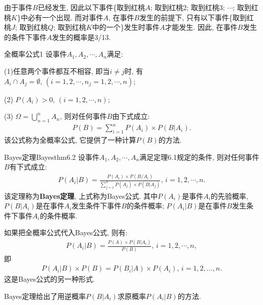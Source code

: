 \begin{result}
由于事件$B$已经发生, 因此以下事件\{取到红桃$A$; 取到红桃2; 取到红桃3; $\cdots$; 取到红桃$K$\}中必有一个出现.
而对事件$A$, 在事件$B$发生的前提下, 只有以下事件\{取到红桃$J$; 取到红桃$Q$; 取到红桃$K$中的一个\}发生时事件$A$才能发生.
因此, 在事件$B$发生的条件下事件$A$发生的概率是3/13.
\end{result}
\begin{mythm}{全概率公式}{1}
设事件$A_1, A_2, \cdots, A_n$满足:

    (1)任意两个事件都互不相容, 即当$i\neq j$时, 有$A_i\cap A_j=\emptyset,\, (i=1,2,\cdots ,n_j=1,2,\cdots ,n)$;

    (2) $P(A_i)>0,\, (i=1, 2, \cdots, n)$;

    (3) $\Omega=\bigcup_{n=1}^{n} A_{n}$, 则对任何事件$B$由下式成立:
\begin{align}
  P(B)=\sum_{i=1}^{n} P\left(A_{i}\right) \times P\left(B | A_{i}\right).
\end{align}
该公式称为全概率公式, 它提供了一种计算$P(B)$的方法.
\end{mythm}
\begin{mythm}{Bayes定理}{Bayesthm6.2}
设事件$A_1,A_2,\cdots,A_n$满足定理6.1规定的条件, 则对任何事件$B$有下式成立:
\begin{align}
    P\left(A_{i} | B\right)=\frac{P\left(A_{i}\right) \times P\left(B / A_{i}\right)}{\sum_{j=1}^{n} P\left(A_{j}\right) \times P\left(B | A_{j}\right)},\, i=1,2, \cdots, n.
\end{align}
该定理称为\textbf{Bayes定理}, 上式称为Bayes公式. 其中$P(A_i)$是事件$A_i$的先验概率, $P(B|A_i)$是在事件$A_i$发生条件下事件$B$的条件概率; $P(A_i|B)$是在事件$B$发生条件下事件$A_i$的条件概率.
\end{mythm}

如果把全概率公式代入Bayes公式, 则有:
\begin{align}
    P\left(A_{i} | B\right)=\frac{P(A) \times P\left(B | A_{i}\right)}{P(B)},\, i=1,2, \cdots, n,
\end{align}
即
\begin{align}
    P\left(A_{i} | B\right) \times P(B)=P\left(B_{i} | A\right) \times P\left(A_{i}\right),\, i=1,2, \ldots, n.
\end{align}
这是Bayes公式的另一种形式.
\begin{remark}
    Bayes定理给出了用逆概率$P(B|A_i)$求原概率$P(A_i|B)$的方法.
\end{remark}
